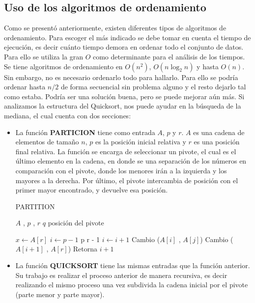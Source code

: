 \documentclass[final,a4paper,romanappendices]{IEEEtran}\usepackage[]{graphicx}\usepackage[]{color}
\theoremstyle{definition}
\begin{document}
\subsection{Uso de los algoritmos de ordenamiento}

Como se presentó anteriormente, existen diferentes tipos de algoritmos de ordenamiento. Para escoger el más indicado se debe tomar en cuenta el tiempo de ejecución, es decir cuánto tiempo demora en ordenar todo el conjunto de datos. Para ello se utiliza la gran $O$ como determinante para el análisis de los tiempos. Se tiene algoritmos de ordenamiento en $O(n^2)$, $O(n\log_{2}n)$ y hasta $O(n)$.
\newline
Sin embargo, no es necesario ordenarlo todo para hallarlo. Para ello se podría ordenar hasta $n/2$ de forma secuencial sin problema alguno y el resto dejarlo tal como estaba. Podría ser una solución buena, pero se puede mejorar aún más. Si analizamos la estructura del Quicksort, nos puede ayudar en la búsqueda de la mediana, el cual cuenta con dos secciones:
\newline
\begin{itemize}
	\item La función {\bf{PARTICION}} tiene como entrada $A$, $p$ y $r$. $A$ es una cadena de elementos de tamaño $n$, $p$ es la posición inicial relativa y $r$ es una posición final relativa. La función se encarga de seleccionar un pivote, el cual es el último elemento en la cadena, en donde se una separación de los números en comparación con el pivote, donde los menores irán a la izquierda y los mayores a la derecha. Por último, el pivote intercambia de posición con el primer mayor encontrado, y devuelve esa posición.



\begin{algorithm}[ht]
\caption{PARTITION}
\begin{algorithmic}[1]
	
	\Require $A$ , $p$ , $r$
	\Ensure $q$ posición del pivote
	
	\State $x \gets A[r]$
	\State $i \gets p-1$
	 {p} {r - 1}		
			\State $i \gets i+1$
			\State Cambio ($A[i]$ , $A[j]$)
			\State Cambio ($A[i+1]$ , $A[r]$)
		\EndIf
	\EndFor
	\State Retorna $i+1$

\end{algorithmic}
\end{algorithm}


	\item La función {\bf{QUICKSORT}} tiene las mismas entradas que la función anterior. Su trabajo es realizar el proceso anterior de manera recursiva, es decir realizando el mismo proceso una vez subdivida la cadena inicial por el pivote (parte menor y parte mayor).

\end{itemize}
\end{document}
